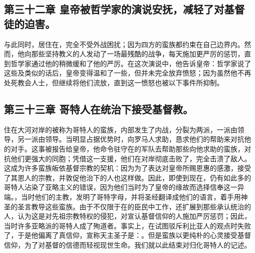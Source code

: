 
\subsection{第三十二章 皇帝被哲学家的演说安抚，减轻了对基督徒的迫害。}

与此同时，居住在，完全不受外战困扰；因为四方的蛮族都约束在自己边界内。然而，他向那些坚持教义的人发动了一场最残酷的战争，每天施加更严厉的惩罚，直到哲学家通过他的稍微缓和了他的严厉。在这次演说中，他告诉皇帝：哲学家说了这些及类似的话后，皇帝变得温和了一些，但并未完全放弃愤怒；因为虽然他不再处死教会人士，但继续将他们流放，直到这一愤怒也被以下事件所抑制。\par


\subsection{第三十三章 哥特人在统治下接受基督教。}

住在大河对岸的被称为哥特人的蛮族，内部发生了内战，分裂为两派，一派由领导，另一派由领导。当明显占据优势时，向罗马人求助，恳求他们的帮助来对抗他的对手。这事被报告给皇帝，他命令驻守在的军队去帮助那些向他求助的蛮族，对抗他们更强大的同胞；凭借这一支援，他们在对岸彻底击败了，完全击溃了敌人。这成为许多蛮族皈依基督宗教的契机：因为为了表达对皇帝所赐恩惠的感激，接受了其恩人的宗教，并敦促他治下的人也这样做。因此，即使到现在，仍有如此多的哥特人沾染了亚略主义的错误，因为他们当时为了皇帝的缘故而选择信奉这一异端。，当时他们的主教，发明了哥特字母，并将圣经翻译成他们的语言，着手用神圣的圣言教导这些蛮族。由于不仅限于在的臣民中工作，还扩展到那些承认统治的人，认为这是对先祖宗教特权的侵犯，对宣认基督信仰的人施加严厉惩罚；因此，当时许多亚略派的哥特人成了殉道者。事实上，在试图驳斥利比亚人的观点时失败了，于是他偏离了真信仰，宣称天主圣子是：。但是蛮族以更纯朴的心灵接受基督信仰，为了对基督的信德而轻视现世生命。我们就以此结束对归化哥特人的记述。\par

